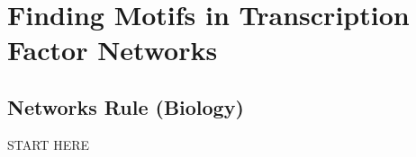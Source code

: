 \chapter[Finding Motifs in Transcription Factor Networks]{Finding Motifs in Transcription Factor Networks}
\label{chapter:motifs}
\renewcommand{\chaptertitle}{Finding Motifs in Transcription Factor Networks}


\FloatBarrier

\section{Networks Rule (Biology)}
\label{sec:introduction}

START HERE